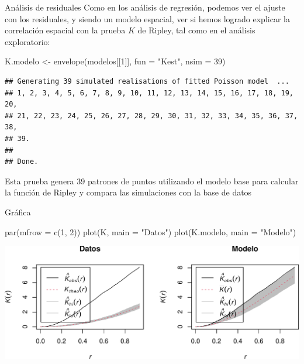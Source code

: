 \documentclass[
  11pt,
  ignorenonframetext,
]{beamer}
\newenvironment{Shaded}{}{}
\newcommand{\AttributeTok}[1]{\textcolor[rgb]{0.49,0.56,0.16}{#1}}
\newcommand{\DecValTok}[1]{\textcolor[rgb]{0.25,0.63,0.44}{#1}}
\newcommand{\FunctionTok}[1]{\textcolor[rgb]{0.02,0.16,0.49}{#1}}
\newcommand{\NormalTok}[1]{#1}
\newcommand{\OtherTok}[1]{\textcolor[rgb]{0.00,0.44,0.13}{#1}}
\newcommand{\StringTok}[1]{\textcolor[rgb]{0.25,0.44,0.63}{#1}}
\begin{document}
\begin{frame}[fragile]{Análisis de residuales}
\protect\hypertarget{anuxe1lisis-de-residuales}{}
Como en los análisis de regresión, podemos ver el ajuste con los
residuales, y siendo un modelo espacial, ver si hemos logrado explicar
la correlación espacial con la prueba \(K\) de Ripley, tal como en el
análisis exploratorio:

\begin{Shaded}
\begin{Highlighting}[]
\NormalTok{K.modelo }\OtherTok{\textless{}{-}} \FunctionTok{envelope}\NormalTok{(modelos[[}\DecValTok{1}\NormalTok{]], }\AttributeTok{fun =} \StringTok{"Kest"}\NormalTok{, }\AttributeTok{nsim =} \DecValTok{39}\NormalTok{)}
\end{Highlighting}
\end{Shaded}

\begin{verbatim}
## Generating 39 simulated realisations of fitted Poisson model  ...
## 1, 2, 3, 4, 5, 6, 7, 8, 9, 10, 11, 12, 13, 14, 15, 16, 17, 18, 19, 20,
## 21, 22, 23, 24, 25, 26, 27, 28, 29, 30, 31, 32, 33, 34, 35, 36, 37, 38, 
## 39.
## 
## Done.
\end{verbatim}

Esta prueba genera 39 patrones de puntos utilizando el modelo base para
calcular la función de Ripley y compara las simulaciones con la base de
datos
\end{frame}

\begin{frame}[fragile]{Gráfica}
\protect\hypertarget{gruxe1fica}{}
\begin{Shaded}
\begin{Highlighting}[]
\FunctionTok{par}\NormalTok{(}\AttributeTok{mfrow =} \FunctionTok{c}\NormalTok{(}\DecValTok{1}\NormalTok{, }\DecValTok{2}\NormalTok{))}
\FunctionTok{plot}\NormalTok{(K, }\AttributeTok{main =} \StringTok{"Datos"}\NormalTok{)}
\FunctionTok{plot}\NormalTok{(K.modelo, }\AttributeTok{main =} \StringTok{"Modelo"}\NormalTok{)}
\end{Highlighting}
\end{Shaded}

\begin{center}\includegraphics{Tutorial-spatstat-2_files/figure-beamer/unnamed-chunk-19-1} \end{center}
\end{frame}
\end{document}

